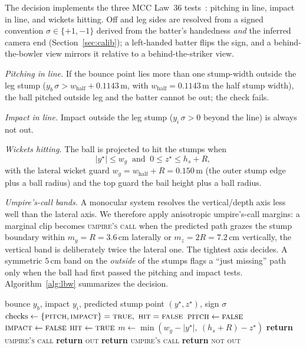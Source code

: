 \documentclass[journal]{IEEEtran}
\begin{document}
The decision implements the three MCC Law~36 tests~\cite{mcc2017laws}:
pitching in line, impact in line, and wickets hitting. Off and leg sides are
resolved from a signed convention $\sigma\in\{+1,-1\}$ derived from the batter's
handedness \emph{and} the inferred camera end (Section~\ref{sec:calib}); a
left-handed batter flips the sign, and a behind-the-bowler view mirrors it
relative to a behind-the-striker view.

\emph{Pitching in line.} If the bounce point lies more than one stump-width
outside the leg stump ($y_b\,\sigma > w_{\text{half}}+0.1143$\,m, with
$w_{\text{half}}=0.1143$\,m the half stump width), the ball pitched outside leg
and the batter cannot be out; the check fails.

\emph{Impact in line.} Impact outside the leg stump ($y_i\,\sigma>0$ beyond the
line) is always not out.

\emph{Wickets hitting.} The ball is projected to hit the stumps when
\begin{equation}
|y^\star|\le w_g \;\;\text{and}\;\; 0\le z^\star\le h_s+R,
\end{equation}
with the lateral wicket guard $w_g=w_{\text{half}}+R=0.150$\,m (the outer stump
edge plus a ball radius) and the top guard the bail height plus a ball radius.

\emph{Umpire's-call bands.} A monocular system resolves the vertical/depth axis
less well than the lateral axis. We therefore apply anisotropic umpire's-call
margins: a marginal clip becomes \textsc{umpire's call} when the predicted path
grazes the stump boundary within $m_y=R=3.6$\,cm laterally or $m_z=2R=7.2$\,cm
vertically, the vertical band is deliberately twice the lateral one. The
tightest axis decides. A symmetric $5$\,cm band on the \emph{outside} of the
stumps flags a ``just missing'' path only when the ball had first passed the
pitching and impact tests. Algorithm~\ref{alg:lbw} summarizes the decision.

\begin{algorithm}[!t]
\caption{MCC Law~36 decision with monocular bands}
\label{alg:lbw}
\begin{algorithmic}[1]
\REQUIRE bounce $y_b$, impact $y_i$, predicted stump point $(y^\star,z^\star)$,
sign $\sigma$
\STATE $\text{checks}\gets\{\textsc{pitch},\textsc{impact}\}=\textsc{true},\ \textsc{hit}=\textsc{false}$
  \STATE $\textsc{pitch}\gets\textsc{false}$ 
\ENDIF
{}
  \STATE $\textsc{impact}\gets\textsc{false}$ 
\ENDIF
{}
  \STATE $\textsc{hit}\gets\textsc{true}$
  \STATE $m\gets\min(w_g-|y^\star|,\ (h_s+R)-z^\star)$
    \STATE \textbf{return} \textsc{umpire's call}
  \ENDIF
\ENDIF
{}
  \STATE \textbf{return} \textsc{out}
  \STATE \textbf{return} \textsc{umpire's call}
\ELSE
  \STATE \textbf{return} \textsc{not out}
\ENDIF
\end{algorithmic}
\end{algorithm}
\end{document}

